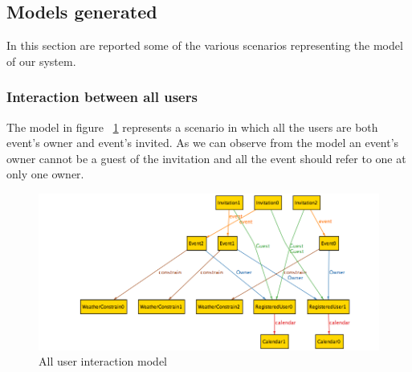 \newpage
\subsection{Models generated}
In this section are reported some of the various scenarios representing the model of our system.
\subsubsection{Interaction between all users}
The model in figure ~\ref{fig:allint} represents a scenario in which all the users are both event's owner and event's invited. As we can observe from the model an  event's owner cannot be a guest of the invitation and all the event should refer to one at only one owner.
\begin{center}
 \begin{figure}[H]
    \includegraphics[width=1\textwidth,height=0.5\textwidth]{./Alloy/allInteration.png}
    \caption{All user interaction model}
     \label{fig:allint}
     \end{figure}
   \end{center} 
